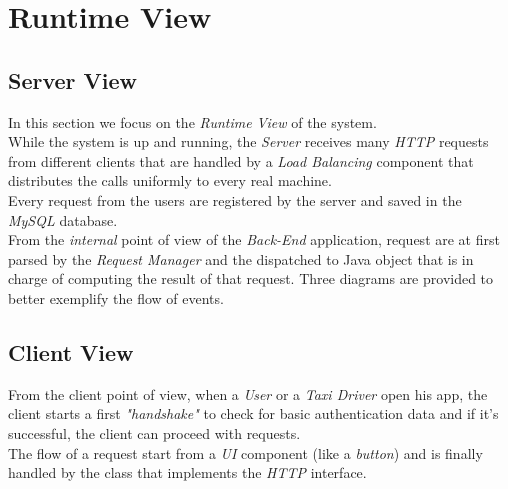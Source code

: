 \section{Runtime View} %
\label{sec:runtime_view}
\subsection{Server View} %
\label{sub:server_view}

In this section we focus on the \emph{Runtime View} of the system.\\
While the system is up and running, the \emph{Server} receives many \emph{HTTP} requests from different clients that are handled by a \emph{Load Balancing} component that distributes the calls uniformly to every real machine.\\
Every request from the users are registered by the server and saved in the \emph{MySQL} database.\\
From the \emph{internal} point of view of the \emph{Back-End} application, request are at first parsed by the \emph{Request Manager} and the dispatched to Java object that is in charge of computing the result of that request. Three diagrams are provided to better exemplify the flow of events.\\
\subsection{Client View} %
\label{sub:client_view}

From the client point of view, when a \emph{User} or a \emph{Taxi Driver} open his app, the client starts a first \emph{"handshake"} to check for basic authentication data and if it's successful, the client can proceed with requests.\\
The flow of a request start from a \emph{UI} component (like a \emph{button}) and is finally handled by the class that implements the \emph{HTTP} interface.
